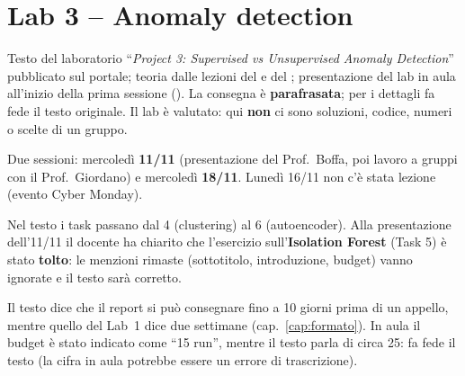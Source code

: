 \chapter{Lab 3 -- Anomaly detection}
\label{cap:lab3}

\begin{nota}
Testo del laboratorio ``\emph{Project 3: Supervised vs Unsupervised Anomaly Detection}'' pubblicato
sul portale; teoria dalle lezioni del  e del ;
presentazione del lab in aula all'inizio della prima sessione (). La
consegna è \textbf{parafrasata}; per i dettagli fa fede il testo originale. Il lab è valutato: qui
\textbf{non} ci sono soluzioni, codice, numeri o scelte di un gruppo.
\end{nota}

\begin{nota}
Due sessioni: mercoledì \textbf{11/11} (presentazione del Prof.~Boffa, poi lavoro a gruppi con il
Prof.~Giordano) e mercoledì \textbf{18/11}. Lunedì 16/11 non c'è stata lezione (evento Cyber Monday).
\end{nota}

\begin{nota}
Nel testo i task passano dal 4 (clustering) al 6 (autoencoder). Alla presentazione dell'11/11 il docente
ha chiarito che l'esercizio sull'\textbf{Isolation Forest} (Task 5) è stato \textbf{tolto}: le menzioni
rimaste (sottotitolo, introduzione, budget) vanno ignorate e il testo sarà corretto.
\end{nota}

\begin{verifica}
Il testo dice che il report si può consegnare fino a 10 giorni prima di un appello, mentre quello del
Lab~1 dice due settimane (cap.~\ref{cap:formato}). In aula il budget è stato indicato come ``15 run'',
mentre il testo parla di circa 25: fa fede il testo (la cifra in aula potrebbe essere un errore di
trascrizione).
\end{verifica}

